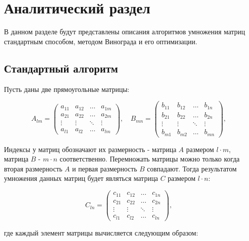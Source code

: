 \chapter{Аналитический раздел}

В данном разделе будут представлены описания алгоритмов умножения матриц стандартным способом, методом Винограда и его оптимизации.

\section{Стандартный алгоритм}

Пусть даны две прямоугольные матрицы:

\begin{equation}
	A_{lm} = \begin{pmatrix}
		a_{11} & a_{12} & \ldots & a_{1m}\\
		a_{21} & a_{22} & \ldots & a_{2m}\\
		\vdots & \vdots & \ddots & \vdots\\
		a_{l1} & a_{l2} & \ldots & a_{lm}
	\end{pmatrix},
	\quad
	B_{mn} = \begin{pmatrix}
		b_{11} & b_{12} & \ldots & b_{1n}\\
		b_{21} & b_{22} & \ldots & b_{2n}\\
		\vdots & \vdots & \ddots & \vdots\\
		b_{m1} & b_{m2} & \ldots & b_{mn}
	\end{pmatrix},
\end{equation}

Индексы у матриц обозначают их размерность - матрица $A$ размером $l \cdot m$, матрица $B$ - $m \cdot n$ соответственно. Перемножать матрицы можно только когда вторая размерность $A$ и первая размерность $B$ совпадают. Тогда результатом умножения данных матриц будет являться матрица $C$ размером $l \cdot n$:

\begin{equation}
	C_{ln} = \begin{pmatrix}
		c_{11} & c_{12} & \ldots & c_{1n}\\
		c_{21} & c_{22} & \ldots & c_{2n}\\
		\vdots & \vdots & \ddots & \vdots\\
		c_{l1} & c_{l2} & \ldots & c_{ln}
	\end{pmatrix},
\end{equation}

где каждый элемент матрицы вычисляется следующим образом:

